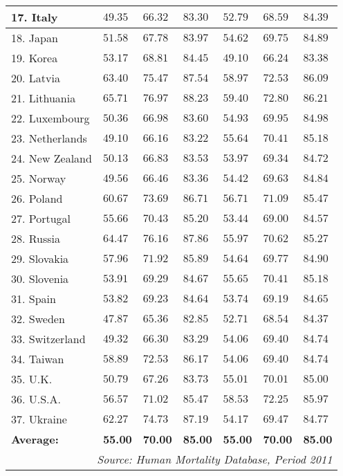 \documentclass[12pt, titlepage]{article}%
\begin{document}
\begin{longtable}{||
    p{95pt}|
    p{35pt}|
    p{35pt}|
    p{35pt}|
    p{35pt}|
    p{35pt}|
    p{35pt}
||}
17. Italy & $49.35$ & $66.32$ & $83.30$ & $52.79$ & $68.59$ & $84.39$\\ \hline \hline
18. Japan & $51.58$ & $67.78$ & $83.97$ & $54.62$ & $69.75$ & $84.89$\\ \hline \hline
19. Korea & $53.17$ & $68.81$ & $84.45$ & $49.10$ & $66.24$ & $83.38$\\ \hline \hline
20. Latvia & $63.40$ & $75.47$ & $87.54$ & $58.97$ & $72.53$ & $86.09$\\ \hline \hline
21. Lithuania & $65.71$ & $76.97$ & $88.23$ & $59.40$ & $72.80$ & $86.21$\\ \hline \hline
22. Luxembourg & $50.36$ & $66.98$ & $83.60$ & $54.93$ & $69.95$ & $84.98$\\ \hline \hline
23. Netherlands & $49.10$ & $66.16$ & $83.22$ & $55.64$ & $70.41$ & $85.18$\\ \hline \hline
24. New Zealand & $50.13$ & $66.83$ & $83.53$ & $53.97$ & $69.34$ & $84.72$\\ \hline \hline
25. Norway & $49.56$ & $66.46$ & $83.36$ & $54.42$ & $69.63$ & $84.84$\\ \hline \hline
26. Poland & $60.67$ & $73.69$ & $86.71$ & $56.71$ & $71.09$ & $85.47$\\ \hline \hline
27. Portugal & $55.66$ & $70.43$ & $85.20$ & $53.44$ & $69.00$ & $84.57$\\ \hline \hline
28. Russia & $64.47$ & $76.16$ & $87.86$ & $55.97$ & $70.62$ & $85.27$\\ \hline \hline
29. Slovakia & $57.96$ & $71.92$ & $85.89$ & $54.64$ & $69.77$ & $84.90$\\ \hline \hline
30. Slovenia & $53.91$ & $69.29$ & $84.67$ & $55.65$ & $70.41$ & $85.18$\\ \hline \hline
31. Spain & $53.82$ & $69.23$ & $84.64$ & $53.74$ & $69.19$ & $84.65$\\ \hline \hline
32. Sweden & $47.87$ & $65.36$ & $82.85$ & $52.71$ & $68.54$ & $84.37$\\ \hline \hline
33. Switzerland & $49.32$ & $66.30$ & $83.29$ & $54.06$ & $69.40$ & $84.74$\\ \hline \hline
34. Taiwan & $58.89$ & $72.53$ & $86.17$ & $54.06$ & $69.40$ & $84.74$\\ \hline \hline
35. U.K. & $50.79$ & $67.26$ & $83.73$ & $55.01$ & $70.01$ & $85.00$\\ \hline \hline
36. U.S.A. & $56.57$ & $71.02$ & $85.47$ & $58.53$ & $72.25$ & $85.97$\\ \hline \hline
37. Ukraine & $62.27$ & $74.73$ & $87.19$ & $54.17$ & $69.47$ & $84.77$\\ \hline \hline
{\bf Average:} & {\bf55.00} & {\bf70.00} & {\bf85.00} & {\bf55.00} & {\bf70.00} & {\bf85.00}\\ \hline \hline
\hline
\multicolumn{7}{||r||}{{\em Source: Human Mortality Database, Period 2011}} \\ \hline\hline
\end{longtable}
\end{document}
